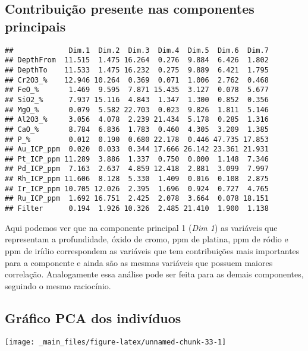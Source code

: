 \documentclass[
]{article}
\begin{document}
\hypertarget{contribuiuxe7uxe3o-presente-nas-componentes-principais}{%
\subsection{Contribuição presente nas componentes principais}\label{contribuiuxe7uxe3o-presente-nas-componentes-principais}}

\begin{verbatim}
##             Dim.1  Dim.2  Dim.3  Dim.4  Dim.5  Dim.6  Dim.7
## DepthFrom  11.515  1.475 16.264  0.276  9.884  6.426  1.802
## DepthTo    11.533  1.475 16.232  0.275  9.889  6.421  1.795
## Cr2O3_%    12.946 10.264  0.369  0.071  1.006  2.762  0.468
## FeO_%       1.469  9.595  7.871 15.435  3.127  0.078  5.677
## SiO2_%      7.937 15.116  4.843  1.347  1.300  0.852  0.356
## MgO_%       0.079  5.582 22.703  0.023  9.826  1.811  5.146
## Al2O3_%     3.056  4.078  2.239 21.434  5.178  0.285  1.316
## CaO_%       8.784  6.836  1.783  0.460  4.305  3.209  1.385
## P_%         0.012  0.190  0.680 22.178  0.446 47.735 17.853
## Au_ICP_ppm  0.020  0.033  0.344 17.666 26.142 23.361 21.931
## Pt_ICP_ppm 11.289  3.886  1.337  0.750  0.000  1.148  7.346
## Pd_ICP_ppm  7.163  2.637  4.859 12.418  2.881  3.099  7.997
## Rh_ICP_ppm 11.606  8.128  5.330  1.409  0.016  0.108  2.875
## Ir_ICP_ppm 10.705 12.026  2.395  1.696  0.924  0.727  4.765
## Ru_ICP_ppm  1.692 16.751  2.425  2.078  3.664  0.078 18.151
## Filter      0.194  1.926 10.326  2.485 21.410  1.900  1.138
\end{verbatim}

Aqui podemos ver que na componente principal 1 (\emph{Dim 1}) as variáveis que representam a profundidade, óxido de cromo, ppm de platina, ppm de ródio e ppm de irídio correspondem as variáveis que tem contribuições mais importantes para a componente e ainda são as mesmas variáveis que possuem maiores correlação. Analogamente essa análise pode ser feita para as demais componentes, seguindo o mesmo raciocínio.

\hypertarget{gruxe1fico-pca-dos-indivuxedduos}{%
\subsection{Gráfico PCA dos indivíduos}\label{gruxe1fico-pca-dos-indivuxedduos}}

\begin{center}\texttt{[image: \_main\_files/figure-latex/unnamed-chunk-33-1]} \end{center}
\end{document}

